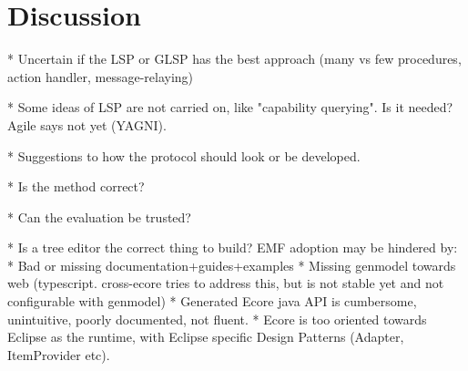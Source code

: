 \chapter{Discussion}\label{chap:discussion}


* Uncertain if the LSP or GLSP has the best approach (many vs few procedures, action handler, message-relaying)

* Some ideas of LSP are not carried on, like "capability querying". Is it needed? Agile says not yet (YAGNI).

* Suggestions to how the protocol should look or be developed.

* Is the method correct?

* Can the evaluation be trusted?

* Is a tree editor the correct thing to build? EMF adoption may be hindered by:
  * Bad or missing documentation+guides+examples
  * Missing genmodel towards web (typescript. cross-ecore tries to address this, but is not stable yet and not configurable with genmodel)
  * Generated Ecore java API is cumbersome, unintuitive, poorly documented, not fluent.
  * Ecore is too oriented towards Eclipse as the runtime, with Eclipse specific Design Patterns (Adapter, ItemProvider etc).